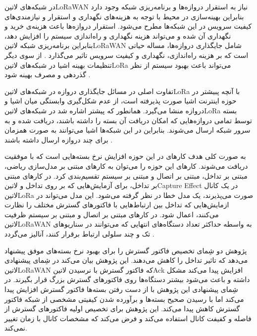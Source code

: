 
در شبکه‌های ‌لاتین{LoRaWAN} نیاز به استقرار دروازه‌ها و برنامه‌ریزی شبکه وجود دارد بنابراین بهینه‌سازی در محیط با توجه به هزینه‌های نگهداری و استقرار و نیازمندی‌های کیفیت سرویس
در این شبکه‌ها مطرح می‌شود. استقرار دروازه‌ها باعث هزینه‌ی خرید و نگهداری آن شده و می‌تواند هزینه نگهداری و راه‌اندازی سیستم را افزایش دهد،
بنابراین برنامه‌ریزی شبکه ‌لاتین{LoRaWAN} شامل جایگذاری دروازه‌ها، مساله حیاتی است که بر هزینه راه‌اندازی، نگهداری و کیفیت سرویس تاثیر می‌گذارد
.
از سوی دیگر تنظیمات بهینه اشیا در شبکه‌های ‌لاتین{LoRa} می‌تواند باعث بهبود سیستم از نظر گذردهی و مصرف بهینه شود
.

تفاوت اصلی در مسائل جایگذاری دروازه در شبکه‌های ‌لاتین{LoRa} با آنچه پبیشتر در حوزه اینترنت اشیا صورت پذیرفته است،
از عدم شکل‌گیری وابستگی میان اشیا و دروازه منشا می‌گیرد. همانطور که پیشتر اشاره شد در شبکه‌های ‌لاتین{LoRa}
بسته توسط تمامی دروازه‌هایی که امکان دریافت آن بسته را داشته باشند، دریافت شده و به سرور شبکه ارسال می‌شوند.
بنابراین در این شبکه‌ها اشیا می‌توانند به صورت همزمان برای چند دروازه ارسال داشته باشند
.

به صورت کلی هدف کارهای در این حوزه افزایش نرخ بسته‌هایی است که با موفقیت دریافت می‌شوند.
کارهای این حوزه را می‌توان به کارهای مبتنی بر مدل‌سازی ریاضی، مبتنی بر تداخل، مبتنی بر اتصال
و مبتنی بر سیستم تقسیم‌بندی کرد.
در کارهای مبتنی بر تداخل،
برای آزمایش‌هایی که بر روی تداخل و ‌لاتین{Capture Effect}
در یک کانال ‌لاتین{LoRa} صورت می‌پذیرند، یک مدل خطا در نظر گرفته می‌شود.
این مدل می‌تواند در ازمایش‌هایی که تداخل بین ارتباط‌هایی با فاکتورهای گسترش مختلف را نظارت می‌کنند،
اعمال شود.
در کارهای مبتنی بر اتصال و مبتنی بر سیستم ظرفیت ‌لاتین{LoRaWAN} به واسطه حداکثر تعداد
دستگاه‌های انتهایی که می‌توانند در سناریوهای تک و چند سلولی ارتباط برقرار کنند، آنالیز می‌گردد
.

پژوهش  دو شِمای تخصیص فاکتور گسترش را برای بهبود نرخ بسته‌های موفق پیشنهاد می‌دهد
که تاثیر تداخل را کاهش می‌دهند.
این پژوهش بیان می‌کند در شِمای پیشنهادی ‌لاتین{LoRaWAN} که فاکتور گسترش با نرسیدن ‌لاتین{Ack}
افزایش پیدا می‌کند مشکل داشته و باعث می‌شود بیشتر دستگاه‌ها روی فاکتورهای گسترش بزرگ قرار بگیرند.
در شِمای پیشنهادی این پژوهش با از دست رفتن بسته‌ها فاکتور گسترش افزایش پیدا می‌کند اما با رسیدن صحیح
بسته‌ها و برآورده شدن کیفیتی مشخصی از شبکه فاکتور گسترش کاهش پیدا می‌کند.
این پژوهش برای تخصیص اولیه فاکتورهای گسترش از فاصله و کفیفت کانال استفاده می‌کند و فرض می‌کند
که مشخصات کانال با زمان تغییر نمی‌کند.

